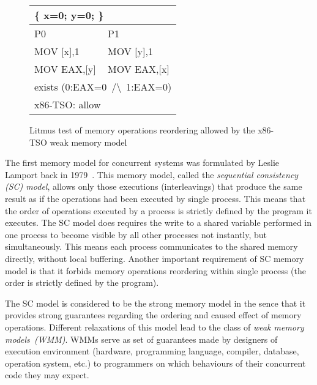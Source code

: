 \begin{figure}
\small \ttfamily
\begin{tabular}{ |l|l| }
\hline
\multicolumn{2}{|l|}{ \{ x=0; y=0; \}} \tabularnewline \hline
P0 & P1 \\ \hline
MOV [x],1 & MOV [y],1 \\
MOV EAX,[y] & MOV EAX,[x] \\
\hline
\multicolumn{2}{|l|}{exists (0:EAX=0~/\textbackslash~1:EAX=0)} \tabularnewline
\hline
\multicolumn{2}{|l|}{x86-TSO: allow} \tabularnewline
\hline

\end{tabular}
\caption{Litmus test of memory operations reordering allowed by the x86-TSO weak memory model}
\label{simple_wmm_x86}
\end{figure}

The first memory model for concurrent systems was formulated by Leslie Lamport back in 1979~\cite{lamport1979make}. This memory model, called the \textit{sequential consistency (SC) model}, allows only those executions (interleavings) that produce the same result as if the operations had been executed by single process. This means that the order of operations executed by a process is strictly defined by the program it executes. The SC model does requires the write to a shared variable performed in one process to become visible by all other processes not instantly, but simultaneously. This means each process communicates to the shared memory directly, without local buffering. Another important requirement of SC memory model is that it forbids memory operations reordering within single process (the order is strictly defined by the program).

The SC model is considered to be the strong memory model in the sence that it provides strong guarantees regarding the ordering and caused effect of memory operations. Different relaxations of this model lead to the class of \textit{weak memory models~(WMM)}.
WMMs serve as set of guarantees made by designers of execution environment (hardware, programming language, compiler, database, operation system, etc.) to programmers on which behaviours of their concurrent code they may expect. 

